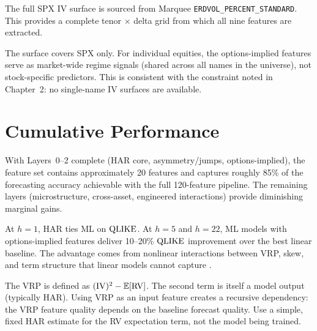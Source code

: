 The full SPX IV surface is sourced from Marquee \texttt{ERDVOL\_PERCENT\_STANDARD}.
This provides a complete tenor $\times$ delta grid from which all nine features are extracted.

The surface covers SPX only.
For individual equities, the options-implied features serve as market-wide regime signals (shared across all names in the universe), not stock-specific predictors.
This is consistent with the constraint noted in Chapter~2: no single-name IV surfaces are available.


\section{Cumulative Performance}
\label{sec:cumulative-performance}

With Layers~0--2 complete (HAR core, asymmetry/jumps, options-implied), the feature set contains approximately 20 features and captures roughly 85\% of the forecasting accuracy achievable with the full 120-feature pipeline.
The remaining layers (microstructure, cross-asset, engineered interactions) provide diminishing marginal gains.



\begin{keyidea}
At $h = 1$, HAR ties ML on $\operatorname{QLIKE}$.
At $h = 5$ and $h = 22$, ML models with options-implied features deliver 10--20\% $\operatorname{QLIKE}$ improvement over the best linear baseline.
The advantage comes from nonlinear interactions between VRP, skew, and term structure that linear models cannot capture \citep{ChristensenSiggaardVeliyev2023}.
\end{keyidea}

\begin{warning}
The VRP is defined as $(\operatorname{IV})^2 - \mathbb{E}[\operatorname{RV}]$.
The second term is itself a model output (typically HAR).
Using VRP as an input feature creates a recursive dependency: the VRP feature quality depends on the baseline forecast quality.
Use a simple, fixed HAR estimate for the RV expectation term, not the model being trained.
\end{warning}
